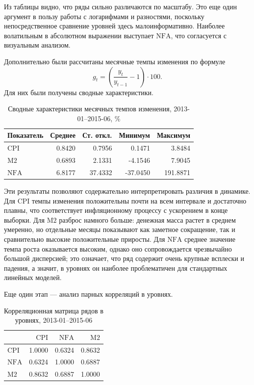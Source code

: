 \documentclass[12pt,a4paper]{article}
\begin{document}
Из таблицы видно, что ряды сильно различаются по масштабу. Это еще один аргумент в пользу
работы с логарифмами и разностями, поскольку непосредственное сравнение уровней здесь
малоинформативно. Наиболее волатильным в абсолютном выражении выступает $\mathrm{NFA}$, что
согласуется с визуальным анализом.

Дополнительно были рассчитаны месячные темпы изменения по формуле
\[
g_t = \left(\frac{y_t}{y_{t-1}} - 1\right)\cdot 100.
\]
Для них были получены сводные характеристики.

\begin{table}[H]
\centering
\caption{Сводные характеристики месячных темпов изменения, 2013-01--2015-06, \%}
\begin{tabular}{lrrrr}
\toprule
Показатель & Среднее & Ст. откл. & Минимум & Максимум \\
\midrule
$\mathrm{CPI}$ & 0.8420 & 0.7956 & 0.1471 & 3.8484 \\
$\mathrm{M2}$ & 0.6893 & 2.1331 & -4.1546 & 7.9045 \\
$\mathrm{NFA}$ & 6.8177 & 37.4332 & -37.0450 & 191.8871 \\
\bottomrule
\end{tabular}
\end{table}

Эти результаты позволяют содержательно интерпретировать различия в динамике. Для $\mathrm{CPI}$
темпы изменения положительны почти на всем интервале и достаточно плавны, что соответствует
инфляционному процессу с ускорением в конце выборки. Для $\mathrm{M2}$ разброс намного больше:
денежная масса растет в среднем умеренно, но отдельные месяцы показывают как заметное
сокращение, так и сравнительно высокие положительные приросты. Для $\mathrm{NFA}$ среднее значение
темпа роста оказывается высоким, однако оно сопровождается чрезвычайно большой дисперсией;
это означает, что ряд содержит очень крупные всплески и падения, а значит, в уровнях он
наиболее проблематичен для стандартных линейных моделей.

Еще один этап --- анализ парных корреляций в уровнях.

\begin{table}[H]
\centering
\caption{Корреляционная матрица рядов в уровнях, 2013-01--2015-06}
\begin{tabular}{lrrr}
\toprule
 & $\mathrm{CPI}$ & $\mathrm{NFA}$ & $\mathrm{M2}$ \\
\midrule
$\mathrm{CPI}$ & 1.0000 & 0.6324 & 0.8632 \\
$\mathrm{NFA}$ & 0.6324 & 1.0000 & 0.6887 \\
$\mathrm{M2}$ & 0.8632 & 0.6887 & 1.0000 \\
\bottomrule
\end{tabular}
\end{table}
\end{document}
